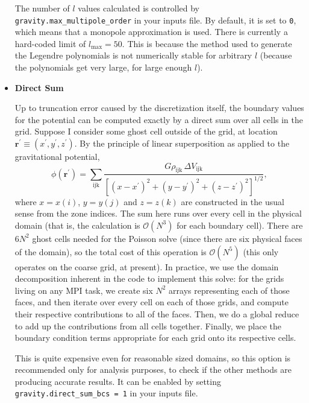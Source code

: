 \begin{itemize}
The number of $l$ values calculated is controlled by
\texttt{gravity.max\_multipole\_order} in your inputs file. By
default, it is set to \texttt{0}, which means that a monopole
approximation is used. There is currently a hard-coded limit of
$l_{\text{max}} = 50$. This is because the method used to generate the
Legendre polynomials is not numerically stable for arbitrary $l$
(because the polynomials get very large, for large enough $l$).

\item \textbf{Direct Sum}

Up to truncation error caused by the discretization itself, the
boundary values for the potential can be computed exactly by a direct
sum over all cells in the grid. Suppose I consider some ghost cell
outside of the grid, at location $\mathbf{r}^\prime \equiv (x^\prime,
y^\prime, z^\prime)$. By the principle of linear superposition as
applied to the gravitational potential,
\begin{equation}
  \phi(\mathbf{r}^\prime) = \sum_{\text{ijk}} \frac{G \rho_{\text{ijk}}\, \Delta V_{\text{ijk}}}{\left[(x - x^\prime)^2 + (y - y^\prime)^2 + (z - z^\prime)^2\right]^{1/2}},
\end{equation}
where $x = x(i)$, $y = y(j)$ and $z = z(k)$ are constructed in the
usual sense from the zone indices. The sum here runs over every cell
in the physical domain (that is, the calculation is $\mathcal{O}(N^3)$
for each boundary cell). There are $6N^2$ ghost cells needed for the
Poisson solve (since there are six physical faces of the domain), so
the total cost of this operation is $\mathcal{O}(N^5)$ (this only
operates on the coarse grid, at present). In practice, we use the
domain decomposition inherent in the code to implement this solve: for
the grids living on any MPI task, we create six $N^2$ arrays
representing each of those faces, and then iterate over every cell on
each of those grids, and compute their respective contributions to all
of the faces. Then, we do a global reduce to add up the contributions
from all cells together. Finally, we place the boundary condition
terms appropriate for each grid onto its respective cells.

This is quite expensive even for reasonable sized domains, so this
option is recommended only for analysis purposes, to check if the
other methods are producing accurate results. It can be enabled by
setting \texttt{gravity.direct\_sum\_bcs = 1} in your inputs file.

\end{itemize}



